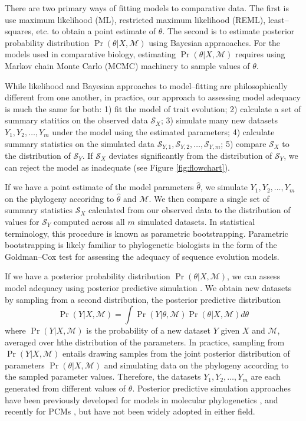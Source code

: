 \documentclass[a4paper,12pt]{article}
\begin{document}
There are two primary ways of fitting models to comparative data. The first is use maximum likelihood (ML), restricted maximum likelihood (REML), least--squares, etc. to obtain a point estimate of $\theta$. The second is to estimate posterior probability distribution $\Pr(\theta|X, \mathcal{M})$ using Bayesian appraoaches.
For the models used in comparative biology, estimating $\Pr(\theta|X, \mathcal{M})$ requires using Markov chain Monte Carlo (MCMC) machinery to sample values of $\theta$.   

While likelihood and Bayesian approaches to model--fitting are philosophically different from one another, in practice, our approach to assessing model adequacy is much the same for both: 1) fit the model of trait evolution; 2) calculate a set of summary statitics on the observed data $\mathcal{S}_X$; 3) simulate many new datasets $Y_1, Y_2, \ldots, Y_m$ under the model using the estimated parameters; 4) calculate summary statistics on the simulated data $\mathcal{S}_{Y,1}, \mathcal{S}_{Y,2}, \ldots, \mathcal{S}_{Y,m}$; 5) compare $\mathcal{S}_X$ to the distribution of $\mathcal{S}_Y$. If $\mathcal{S}_X$ deviates significantly from the distribution of $\mathcal{S}_Y$, we can reject the model as inadequate (see Figure \ref{fig:flowchart}).

If we have a point estimate of the model parameters $\hat{\theta}$, we simulate $Y_1, Y_2, \ldots, Y_m$ on the phylogeny accoridng to $\hat{\theta}$ and $\mathcal{M}$. We then compare a single set of summary statistics $\mathcal{S}_X$ calculated from our observed data to the distribution of values for $\mathcal{S}_Y$ computed across all $m$ simulated datasets. In statistical terminology, this procedure is known as parametric bootstrapping. Parametric bootstrapping is likely familiar to phylogenetic biologists in the form of the Goldman--Cox test \citep{Goldman} for assessing the adequacy of sequence evolution models.

If we have a posterior probability distribution $\Pr(\theta|X, \mathcal{M})$, we can assess model adequacy using posterior predictive simulation \citep{Rubin1984, Gelman1996}. We obtain new datasets by sampling from a second distribution, the posterior predictive distribution
\begin{equation}
\Pr(Y|X,\mathcal{M}) = \int \Pr(Y|\theta, \mathcal{M})\Pr(\theta |X,\mathcal{M})d\theta
\end{equation}
where $\Pr(Y|X,\mathcal{M})$ is the probability of a new dataset $Y$ given $X$ and $\mathcal{M}$, averaged over hthe distribution of the parameters. In practice, sampling from $\Pr(Y|X,\mathcal{M})$ entails drawing samples from the joint posterior distribution of parameters $\Pr(\theta|X, \mathcal{M})$ and simulating data on the phylogeny according to the sampled parameter values. Therefore, the datasets $Y_1, Y_2, \ldots, Y_m$ are each generated from different values of $\theta$.  
Posterior predictive simulation approaches have been previously developed for models in molecular phylogenetics \citep{Bollback2002, Reid2013, Lewis2013, Brown2013}, and recently for PCMs \citep{SlaterPennell}, but have not been widely adopted in either field.
\end{document}
